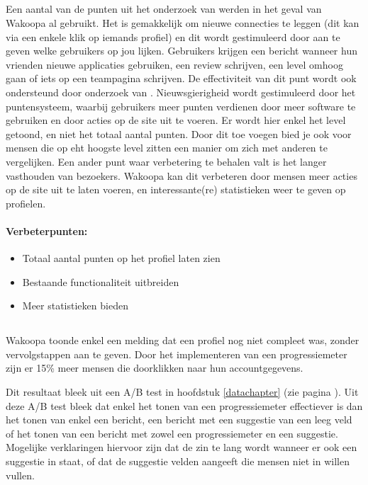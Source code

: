 \documentclass[a4paper, 10pt, pdftex]{report}
\begin{document}
    \subsection{\cite{Berlanga2007}}
    Een aantal van de punten uit het onderzoek van \citeauthor{Berlanga2007} werden in het geval van Wakoopa al gebruikt. Het is gemakkelijk om nieuwe connecties te leggen (dit kan via een enkele klik op iemands profiel) en dit wordt gestimuleerd door aan te geven welke gebruikers op jou lijken. Gebruikers krijgen een bericht wanneer hun vrienden nieuwe applicaties gebruiken, een review schrijven, een level omhoog gaan of iets op een teampagina schrijven. De effectiviteit van dit punt wordt ook ondersteund door onderzoek van \cite{Berlanga2007}. Nieuwsgierigheid wordt gestimuleerd door het puntensysteem, waarbij gebruikers meer punten verdienen door meer software te gebruiken en door acties op de site uit te voeren. Er wordt hier enkel het level getoond, en niet het totaal aantal punten. Door dit toe voegen bied je ook voor mensen die op eht hoogste level zitten een manier om zich met anderen te vergelijken. Een ander punt waar verbetering te behalen valt is het langer vasthouden van bezoekers. Wakoopa kan dit verbeteren door mensen meer acties op de site uit te laten voeren, en interessante(re) statistieken weer te geven op profielen.

      \paragraph{\textbf{Verbeterpunten:}}
      \begin{itemize}
        \item Totaal aantal punten op het profiel laten zien
        \item Bestaande functionaliteit uitbreiden
        \item Meer statistieken bieden
      \end{itemize}


    \subsection{\cite{Brouns2008}}
    \label{wak:Brouns2008}
    Wakoopa toonde enkel een melding dat een profiel nog niet compleet was, zonder vervolgstappen aan te geven. Door het implementeren van een progressiemeter zijn er 15\% meer mensen die doorklikken naar hun accountgegevens.

    Dit resultaat bleek uit een A/B test in hoofdstuk \ref{datachapter} (zie pagina \pageref{profileprogress}). Uit deze A/B test bleek dat enkel het tonen van een progressiemeter effectiever is dan het tonen van enkel een bericht, een bericht met een suggestie van een leeg veld of het tonen van een bericht met zowel een progressiemeter en een suggestie. Mogelijke verklaringen hiervoor zijn dat de zin te lang wordt wanneer er ook een suggestie in staat, of dat de suggestie velden aangeeft die mensen niet in willen vullen.
\end{document}
